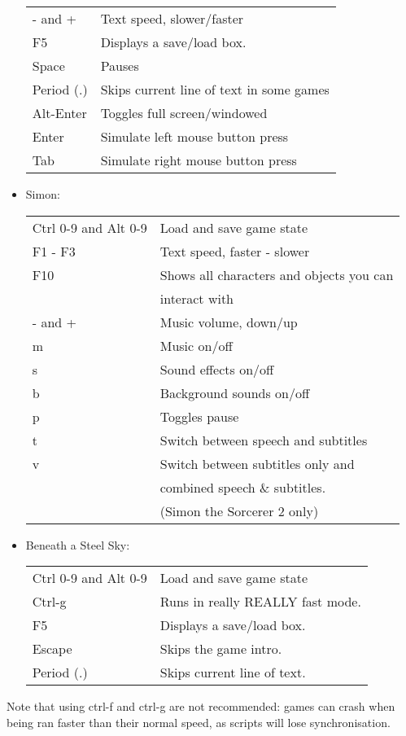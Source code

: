 \begin{itemize}
\begin{tabular}{ll}
    - and +                & Text speed, slower/faster\\
    F5                     & Displays a save/load box.\\
    Space                  & Pauses\\
    Period (.)             & Skips current line of text in some games\\
    Alt-Enter              & Toggles full screen/windowed\\
    Enter                  & Simulate left mouse button press\\
    Tab                    & Simulate right mouse button press\\
  \end{tabular}
\item Simon:\\
  \begin{tabular}{ll}
    Ctrl 0-9 and Alt 0-9   & Load and save game state\\
    F1 - F3                & Text speed, faster - slower\\
    F10                    & Shows all characters and objects you can \\
                           & interact with\\
    - and +                & Music volume, down/up\\
    m                      & Music on/off\\
    s                      & Sound effects on/off\\
    b                      & Background sounds on/off\\
    p                      & Toggles pause\\
    t                      & Switch between speech and subtitles\\
    v                      & Switch between subtitles only and\\
                           & combined speech \& subtitles.\\
                           & (Simon the Sorcerer 2 only)\\
  \end{tabular}
\item Beneath a Steel Sky:\\
  \begin{tabular}{ll}
    Ctrl 0-9 and Alt 0-9   & Load and save game state\\
    Ctrl-g                 & Runs in really REALLY fast mode.\\
    F5                     & Displays a save/load box.\\
    Escape                 & Skips the game intro.\\
    Period (.)             & Skips current line of text.\\
  \end{tabular}
\end{itemize}
Note that using ctrl-f and ctrl-g are not recommended: games can crash when
being ran faster than their normal speed, as scripts will lose synchronisation.
